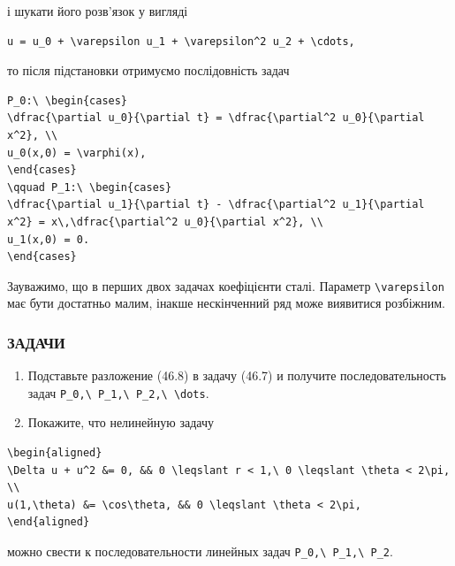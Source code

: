 \documentclass[
  ukrainian,
]{article}
\begin{document}
і шукати його розв'язок у вигляді

\begin{verbatim}
u = u_0 + \varepsilon u_1 + \varepsilon^2 u_2 + \cdots,
\end{verbatim}

то після підстановки отримуємо послідовність задач

\begin{verbatim}
P_0:\ \begin{cases}
\dfrac{\partial u_0}{\partial t} = \dfrac{\partial^2 u_0}{\partial x^2}, \\
u_0(x,0) = \varphi(x),
\end{cases}
\qquad P_1:\ \begin{cases}
\dfrac{\partial u_1}{\partial t} - \dfrac{\partial^2 u_1}{\partial x^2} = x\,\dfrac{\partial^2 u_0}{\partial x^2}, \\
u_1(x,0) = 0.
\end{cases}
\end{verbatim}

Зауважимо, що в перших двох задачах коефіцієнти сталі. Параметр
\texttt{\textbackslash{}varepsilon} має бути достатньо малим, інакше
нескінченний ряд може виявитися розбіжним.

\subsubsection{ЗАДАЧИ}\label{ux437ux430ux434ux430ux447ux438-3}

\begin{enumerate}
\def\labelenumi{\arabic{enumi}.}
\item
  Подставьте разложение (46.8) в задачу (46.7) и получите
  последовательность задач
  \texttt{P\_0,\textbackslash{}\ P\_1,\textbackslash{}\ P\_2,\textbackslash{}\ \textbackslash{}dots}.
\item
  Покажите, что нелинейную задачу
\end{enumerate}

\begin{verbatim}
\begin{aligned}
\Delta u + u^2 &= 0, && 0 \leqslant r < 1,\ 0 \leqslant \theta < 2\pi, \\
u(1,\theta) &= \cos\theta, && 0 \leqslant \theta < 2\pi,
\end{aligned}
\end{verbatim}

можно свести к последовательности линейных задач
\texttt{P\_0,\textbackslash{}\ P\_1,\textbackslash{}\ P\_2}.
\end{document}
